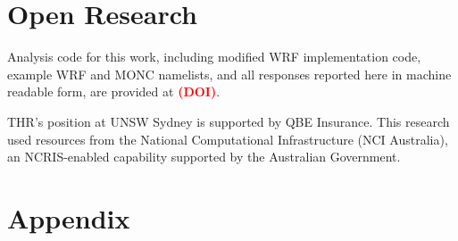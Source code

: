\documentclass[draft]{agujournal2019}
\newcommand{\todo}[1]{\textcolor{red}{\textbf{(#1)}}}
\begin{document}
\section{Open Research}

Analysis code for this work, including modified WRF implementation code, example
WRF and MONC namelists, and all responses reported here in machine readable
form, are provided at \todo{DOI}.

\acknowledgments

THR's position at UNSW Sydney is supported by QBE Insurance. This research used
resources from the National Computational Infrastructure (NCI Australia), an
NCRIS-enabled capability supported by the Australian Government.



%



\newpage
\section*{Appendix}
\setcounter{figure}{0}
\renewcommand{\thefigure}{A\arabic{figure}}
\end{document}
